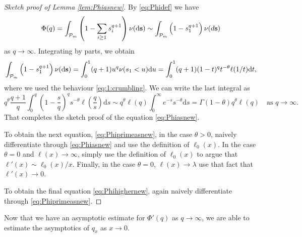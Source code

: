 \documentclass[a4,12pt]{amsart}
\numberwithin{equation}{section}
\newcommand{\MassP}{\mathcal{P}_{\rm m}}
\begin{document}
\begin{proof}[Sketch proof of Lemma \ref{lem:Phiasnew}]
By \eqref{eq:Phidef} we have 
		\begin{equation*}
			\Phi(q) = \int_{\MassP} \left( 1 - \sum_{i \geq 1} s_i^{q+1} \right) \nu(\mathrm{d}  \mathbf{s}) \sim \int_{\MassP} \left( 1 - s_1^{q+1} \right)\nu (\rm d \mathbf{s})
		\end{equation*}
        as $q \to \infty$. Integrating by parts, we obtain 
		\begin{equation*}
			\int_{\MassP}\left(1-s_1^{q+1}\right) \nu(\mathrm{d} \mathbf{s}) = 
			\int_0^1 (q+1) u^{q} \nu(s_1 < u) \mathrm{d} u =
			\int_0^1 (q+1) (1-t)^q t^{-\theta}\ell(1/t) \mathrm{d} t,
		\end{equation*}
        where we used the behaviour \eqref{eq:1:crumbling}. 
		We can write the last integral as
		\begin{equation*}
			q^{\theta} \frac{q+1}{q} 
			\int_0^q \left(1-\frac sq \right)^q s^{-\theta}  \ell\left(\frac{q}{s}\right)\mathrm{d} s \sim q^\theta \ell(q) \int_0^\infty e^{ - s} s^{ - \theta} \mathrm{d}s = \Gamma(1-\theta)q^\theta \ell(q) \quad \text{as $q \to \infty$}.
		\end{equation*}
        That completes the sketch proof of the equation \eqref{eq:Phiasnew}.

        To obtain the next equation, \eqref{eq:Phiprimeasnew}, in the case $\theta > 0$, naively differentiate through \eqref{eq:Phiasnew} and use the definition of $\ell_0(x)$. In the case $\theta = 0$ and $\ell(x) \to \infty$, simply use the definition of $\ell_0(x)$ to argue that $\ell'(x) \sim \ell_0(x)/x$. Finally, in the case $\theta=0$, $\ell(x) \to \lambda$ use that fact that $\ell'(x) \to 0$.

        To obtain the final equation \eqref{eq:Phihighernew}, again naively differentiate through \eqref{eq:Phiprimeasnew}.
\end{proof}

\color{black}
Now that we have an asymptotic estimate for $\Phi'(q)$ as $q \to \infty$, we are able to estimate the asymptotics of $q_x$ as $x \to 0$. 
\end{document}
